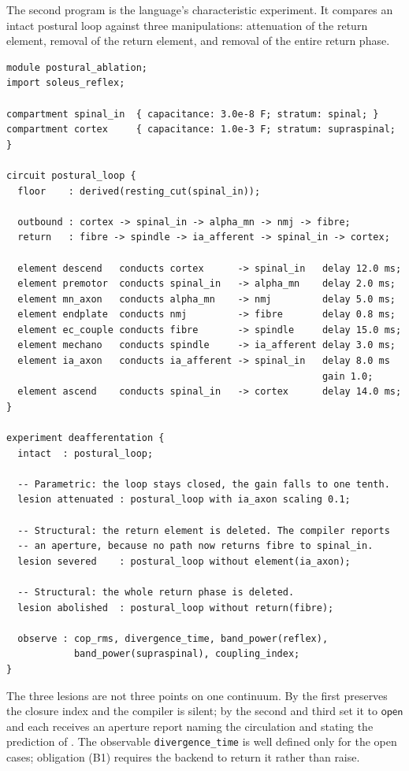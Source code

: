 \documentclass[11pt,twocolumn,a4paper]{article}
\theoremstyle{thmstyle}
\theoremstyle{definition}
\theoremstyle{remark}
\begin{document}
The second program is the language's characteristic experiment. It compares an
intact postural loop against three manipulations: attenuation of the return
element, removal of the return element, and removal of the entire return
phase.

\begin{lstlisting}[style=vvs,caption={\texttt{postural\_ablation.vvs} ---
attenuation and severance are distinct operators.},
label={lst:ablation}]
module postural_ablation;
import soleus_reflex;

compartment spinal_in  { capacitance: 3.0e-8 F; stratum: spinal; }
compartment cortex     { capacitance: 1.0e-3 F; stratum: supraspinal; }

circuit postural_loop {
  floor    : derived(resting_cut(spinal_in));

  outbound : cortex -> spinal_in -> alpha_mn -> nmj -> fibre;
  return   : fibre -> spindle -> ia_afferent -> spinal_in -> cortex;

  element descend   conducts cortex      -> spinal_in   delay 12.0 ms;
  element premotor  conducts spinal_in   -> alpha_mn    delay 2.0 ms;
  element mn_axon   conducts alpha_mn    -> nmj         delay 5.0 ms;
  element endplate  conducts nmj         -> fibre       delay 0.8 ms;
  element ec_couple conducts fibre       -> spindle     delay 15.0 ms;
  element mechano   conducts spindle     -> ia_afferent delay 3.0 ms;
  element ia_axon   conducts ia_afferent -> spinal_in   delay 8.0 ms
                                                        gain 1.0;
  element ascend    conducts spinal_in   -> cortex      delay 14.0 ms;
}

experiment deafferentation {
  intact  : postural_loop;

  -- Parametric: the loop stays closed, the gain falls to one tenth.
  lesion attenuated : postural_loop with ia_axon scaling 0.1;

  -- Structural: the return element is deleted. The compiler reports
  -- an aperture, because no path now returns fibre to spinal_in.
  lesion severed    : postural_loop without element(ia_axon);

  -- Structural: the whole return phase is deleted.
  lesion abolished  : postural_loop without return(fibre);

  observe : cop_rms, divergence_time, band_power(reflex),
            band_power(supraspinal), coupling_index;
}
\end{lstlisting}

The three lesions are not three points on one continuum. By
 the first preserves the closure index and the compiler
is silent; by  the second and third set it to
$\textsf{open}$ and each receives an aperture report naming the circulation
and stating the prediction of . The observable
\texttt{divergence\_time} is well defined only for the open cases; obligation
(B1) requires the backend to return it rather than raise.
\end{document}
